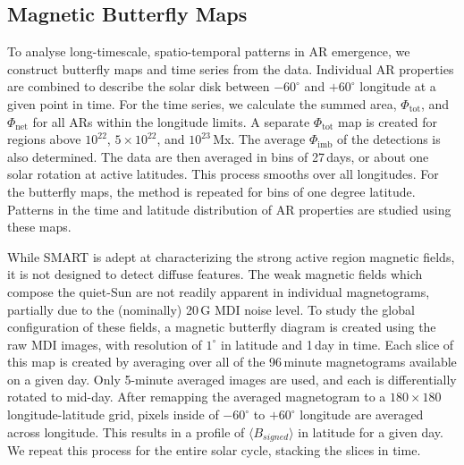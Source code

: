 
\subsection{Magnetic Butterfly Maps}\label{sect:magbuttglob}

To analyse long-timescale, spatio-temporal patterns in \gls{AR} emergence, we construct butterfly maps and time series from the data. Individual \gls{AR} properties are combined to describe the solar disk between $-60^\circ$ and $+60^\circ$ longitude at a given point in time. For the time series, we calculate the summed area, $\Phi_{\mathrm{tot}}$, and $\Phi_{\mathrm{net}}$ for all \glspl{AR} within the longitude limits. A separate $\Phi_{\mathrm{tot}}$ map is created for regions above $10^{22}$, $5\times10^{22}$, and $10^{23}$\,Mx. The average $\Phi_{\mathrm{imb}}$ of the detections is also determined. The data are then averaged in bins of 27\,days, or about one solar rotation at active latitudes. This process smooths over all longitudes. For the butterfly maps, the method is repeated for bins of one degree latitude. Patterns in the time and latitude distribution of \gls{AR} properties are studied using these maps.


While \gls{SMART} is adept at characterizing the strong active region magnetic fields, it is not designed to detect diffuse features. The weak magnetic fields which compose the quiet-Sun are not readily apparent in individual magnetograms, partially due to the (nominally) 20\,G \gls{MDI} noise level. To study the global configuration of these fields, a magnetic butterfly diagram \citep{Harvey:1992} is created using the raw \gls{MDI} images, with resolution of $1^\circ$ in latitude and 1\,day in time. Each slice of this map is created by averaging over all of the 96\,minute magnetograms available on a given day. Only 5-minute averaged images are used, and each is differentially rotated to mid-day. After remapping the averaged magnetogram to a $180\times180$ longitude-latitude grid, pixels inside of $-60^{\circ}$ to $+60^{\circ}$ longitude are averaged across longitude. This results in a profile of $\langle B_{signed} \rangle$ in latitude for a given day. We repeat this process for the entire solar cycle, stacking the slices in time. 


